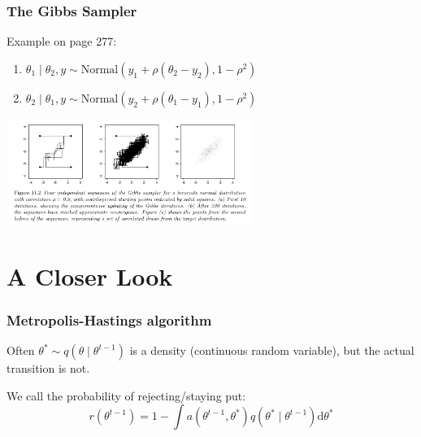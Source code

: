 \documentclass{beamer}
\begin{document}
\begin{frame}
\frametitle{The Gibbs Sampler}

Example on page 277:
\begin{enumerate}
\item $\theta_1 \mid \theta_2, y \sim \text{Normal}(y_1 + \rho(\theta_2 - y_2), 1-\rho^2)$
\item $\theta_2 \mid \theta_1, y \sim \text{Normal}(y_2 + \rho(\theta_1 - y_1), 1-\rho^2)$
\end{enumerate}

\begin{center}
\includegraphics[width=80mm]{gibbs.png}
\end{center}


\end{frame}

\section{A Closer Look}
\begin{frame}
\frametitle{Metropolis-Hastings algorithm}

Often $\theta^* \sim q(\theta \mid \theta^{t-1})$ is a density (continuous random variable), but the actual transition is not. 
\newline

We call the probability of rejecting/staying put: 
$$
r(\theta^{t-1}) = 1 - \int a(\theta^{t-1}, \theta^*)q(\theta^* \mid \theta^{t-1}) \text{d}\theta^* 
$$



\end{frame}
\end{document}
